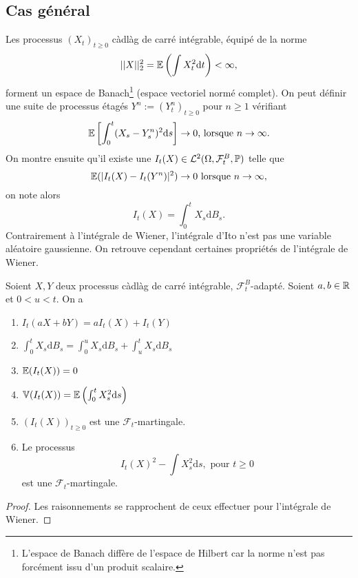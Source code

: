 \subsection{Cas général}

Les processus $(X_t)_{t\geq 0}$ càdlàg de carré intégrable, équipé de la norme
$$
||X||_2^2 = \mathbb{E}\left(\int X_t^2\text{d}t\right)<\infty,
$$ 
forment un espace de Banach\footnote{L'espace de Banach diffère de l'espace de Hilbert car la norme n'est pas forcément issu d'un produit scalaire.} (espace vectoriel normé complet). On peut définir une suite de processus étagés $Y^n:=(Y_t^n)_{t\geq 0}$ pour $n\geq 1$ vérifiant 
$$
\mathbb{E}\left[\int_0^t(X_s - Y_s^n)^2\text{d}s\right]\rightarrow 0\text{, lorsque }n\rightarrow \infty.
$$
On montre ensuite qu'il existe une \va $I_t(X)\in \mathcal{L}^2(\Omega,\mathcal{F}_t^B, \mathbb{P})$ telle que 
$$
\mathbb{E}(|I_t(X) - I_t(Y^n)|^2)\rightarrow 0\text{ lorsque }n\rightarrow\infty,
$$
on note alors 
$$
I_t(X) = \int_0^t X_s\text{d}B_s.
$$
Contrairement à l'intégrale de Wiener, l'intégrale d'Ito n'est pas une variable aléatoire gaussienne. On retrouve cependant certaines propriétés de l'intégrale de Wiener.
\begin{prop}
Soient $X,Y$ deux processus càdlàg de carré intégrable, $\mathcal{F}_t^B$-adapté. Soient $a,b\in \mathbb{R}$ et $0<u<t$. On a 
\begin{enumerate}
\item $I_t(aX+bY) = aI_t(X)+I_t(Y)$
\item $\int_0^tX_s\text{d}B_s = \int_0^uX_s\text{d}B_s + \int_u^tX_s\text{d}B_s$
\item $\mathbb{E}(I_t(X)) = 0$
\item $\mathbb{V}(I_t(X)) = \mathbb{E}\left(\int_0^t X_s^2\text{d}s\right)$
\item $(I_t(X))_{t\geq 0}$ est une $\mathcal{F}_t$-martingale.
\item Le processus 
$$
I_t(X)^2 - \int X_s^2\text{d}s,\text{ pour }t\geq 0
$$ 
est une $\mathcal{F}_t$-martingale.
\end{enumerate}
\end{prop}
\begin{proof}
Les raisonnements se rapprochent de ceux effectuer pour l'intégrale de Wiener. 
\end{proof}
